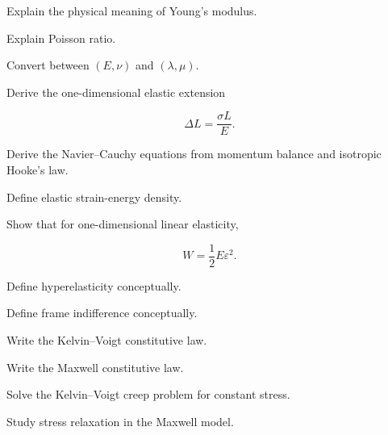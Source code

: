 \begin{exercise}[2]
Explain the physical meaning of Young's modulus.
\end{exercise}

\begin{exercise}[2]
Explain Poisson ratio.
\end{exercise}

\begin{exercise}[3]
Convert between \((E,\nu)\) and \((\lambda,\mu)\).
\end{exercise}

\begin{exercise}[3]
Derive the one-dimensional elastic extension

\[
\Delta L
=
\frac{\sigma L}{E}.
\]
\end{exercise}

\begin{exercise}[3]
Derive the Navier--Cauchy equations from momentum balance and isotropic
Hooke's law.
\end{exercise}

\begin{exercise}[2]
Define elastic strain-energy density.
\end{exercise}

\begin{exercise}[3]
Show that for one-dimensional linear elasticity,

\[
W
=
\frac12E\varepsilon^2.
\]
\end{exercise}

\begin{exercise}[2]
Define hyperelasticity conceptually.
\end{exercise}

\begin{exercise}[2]
Define frame indifference conceptually.
\end{exercise}

\begin{exercise}[2]
Write the Kelvin--Voigt constitutive law.
\end{exercise}

\begin{exercise}[2]
Write the Maxwell constitutive law.
\end{exercise}

\begin{exercise}[3]
Solve the Kelvin--Voigt creep problem for constant stress.
\end{exercise}

\begin{exercise}[3]
Study stress relaxation in the Maxwell model.
\end{exercise}

